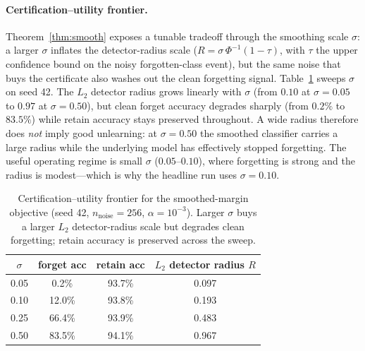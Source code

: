 \documentclass{article}
\begin{document}
\paragraph{Certification--utility frontier.} Theorem~\ref{thm:smooth} exposes a tunable tradeoff through the smoothing scale $\sigma$: a larger $\sigma$ inflates the detector-radius scale ($R = \sigma\,\Phi^{-1}(1-\tau)$, with $\tau$ the upper confidence bound on the noisy forgotten-class event), but the same noise that buys the certificate also washes out the clean forgetting signal. Table~\ref{tab:sigma-frontier} sweeps $\sigma$ on seed 42. The $L_2$ detector radius grows linearly with $\sigma$ (from $0.10$ at $\sigma{=}0.05$ to $0.97$ at $\sigma{=}0.50$), but clean forget accuracy degrades sharply (from $0.2\%$ to $83.5\%$) while retain accuracy stays preserved throughout. A wide radius therefore does \emph{not} imply good unlearning: at $\sigma{=}0.50$ the smoothed classifier carries a large radius while the underlying model has effectively stopped forgetting. The useful operating regime is small $\sigma$ ($0.05$--$0.10$), where forgetting is strong and the radius is modest---which is why the headline run uses $\sigma{=}0.10$.

\begin{table}[t]
  \centering
  \small
  \begin{tabular}{c c c c}
    \toprule
    $\sigma$ & forget acc & retain acc & $L_2$ detector radius $R$ \\
    \midrule
    0.05 & 0.2\%  & 93.7\% & 0.097 \\
    0.10 & 12.0\% & 93.8\% & 0.193 \\
    0.25 & 66.4\% & 93.9\% & 0.483 \\
    0.50 & 83.5\% & 94.1\% & 0.967 \\
    \bottomrule
  \end{tabular}
  \caption{Certification--utility frontier for the smoothed-margin objective (seed 42, $n_{\text{noise}}=256$, $\alpha=10^{-3}$). Larger $\sigma$ buys a larger $L_2$ detector-radius scale but degrades clean forgetting; retain accuracy is preserved across the sweep.}
  \label{tab:sigma-frontier}
\end{table}
\end{document}
